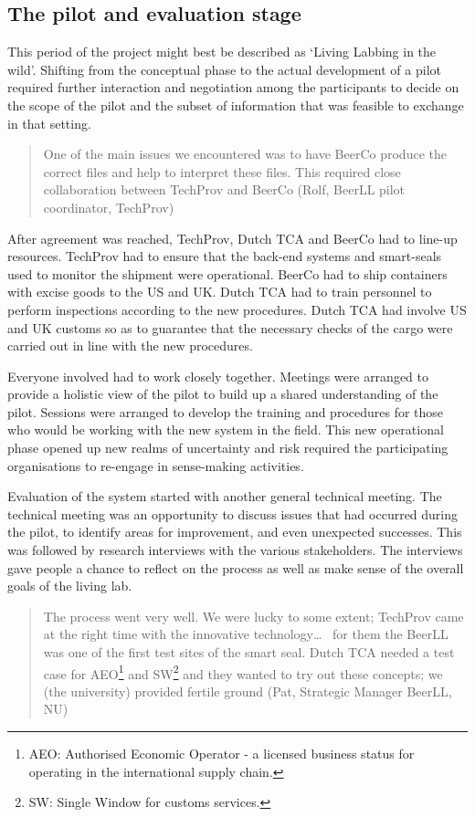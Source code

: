 \documentclass[graybox]{styles/svmult}
\begin{document}
\subsection{The pilot and evaluation stage}
This period of the project might best be described as `Living Labbing in the wild'.
Shifting from the conceptual phase to the actual development of a pilot required further interaction and negotiation among the participants to decide on the scope of the pilot and the subset of information that was feasible to exchange in that setting. 
\blockquote{One of the main issues we encountered was to have BeerCo produce the correct files and help to interpret these files. This required close collaboration between TechProv and BeerCo (Rolf, BeerLL pilot coordinator, TechProv)}
After agreement was reached, TechProv, Dutch TCA and BeerCo had to line-up resources. TechProv had to ensure that the back-end systems and smart-seals used to monitor the shipment were operational. BeerCo had to ship containers with excise goods to the US and UK. Dutch TCA had to train personnel to perform inspections according to the new procedures. Dutch TCA had involve US and UK customs so as to guarantee that the necessary checks of the cargo were carried out in line with the new procedures. 

Everyone involved had to work closely together. Meetings were arranged to provide a holistic view of the pilot to build up a shared understanding of the pilot. Sessions were arranged to develop the training and procedures for those who would be working with the new system in the field. This new operational phase opened up new realms of uncertainty and risk required the participating organisations to re-engage in sense-making activities. 

Evaluation of the system started with another general technical meeting. The technical meeting was an opportunity to discuss issues that had occurred during the pilot, to identify areas for improvement, and even unexpected successes. This was followed by research interviews with the various stakeholders. 
The interviews gave people a chance to reflect on the process as well as make sense of the overall goals of the living lab. 

\blockquote{The process went very well. We were lucky to some extent; TechProv came at the right time with the innovative technology\dots~ for them the BeerLL was one of the first test sites of the smart seal. Dutch TCA needed a test case for AEO\footnote{AEO: Authorised Economic Operator - a licensed business status for operating in the international supply chain.} and SW\footnote{SW: Single Window for customs services.} and they wanted to try out these concepts; we (the university) provided fertile ground (Pat, Strategic Manager BeerLL, NU)}
\end{document}
